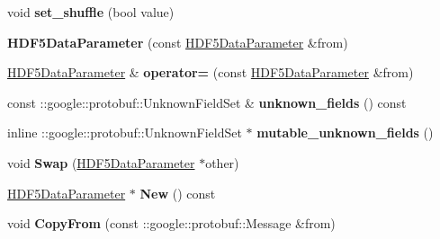 \begin{DoxyCompactItemize}
void {\bfseries set\+\_\+shuffle} (bool value)
\item 
\mbox{\label{classcaffe_1_1_h_d_f5_data_parameter_a2293623f7ee5a6e3eddf5ba1d85a7167}} 
{\bfseries H\+D\+F5\+Data\+Parameter} (const \mbox{\hyperlink{classcaffe_1_1_h_d_f5_data_parameter}{H\+D\+F5\+Data\+Parameter}} \&from)
\item 
\mbox{\label{classcaffe_1_1_h_d_f5_data_parameter_a32b44c77049319d3c9462dbbe1c035d2}} 
\mbox{\hyperlink{classcaffe_1_1_h_d_f5_data_parameter}{H\+D\+F5\+Data\+Parameter}} \& {\bfseries operator=} (const \mbox{\hyperlink{classcaffe_1_1_h_d_f5_data_parameter}{H\+D\+F5\+Data\+Parameter}} \&from)
\item 
\mbox{\label{classcaffe_1_1_h_d_f5_data_parameter_ae8142df8b1c131dd72feabb2b6f55aa2}} 
const \+::google\+::protobuf\+::\+Unknown\+Field\+Set \& {\bfseries unknown\+\_\+fields} () const
\item 
\mbox{\label{classcaffe_1_1_h_d_f5_data_parameter_a88affce8b0da9c58b0a7cda1668a3f1e}} 
inline \+::google\+::protobuf\+::\+Unknown\+Field\+Set $\ast$ {\bfseries mutable\+\_\+unknown\+\_\+fields} ()
\item 
\mbox{\label{classcaffe_1_1_h_d_f5_data_parameter_aa46352d09feb2defaf46d6fe2a24c617}} 
void {\bfseries Swap} (\mbox{\hyperlink{classcaffe_1_1_h_d_f5_data_parameter}{H\+D\+F5\+Data\+Parameter}} $\ast$other)
\item 
\mbox{\label{classcaffe_1_1_h_d_f5_data_parameter_aad83b17bc218bc3b59e68298e0450c49}} 
\mbox{\hyperlink{classcaffe_1_1_h_d_f5_data_parameter}{H\+D\+F5\+Data\+Parameter}} $\ast$ {\bfseries New} () const
\item 
\mbox{\label{classcaffe_1_1_h_d_f5_data_parameter_a548dfb2912846431ed935ea8a5aa1fbd}} 
void {\bfseries Copy\+From} (const \+::google\+::protobuf\+::\+Message \&from)
\item 
\mbox{\label{classcaffe_1_1_h_d_f5_data_parameter_aaaa75f36b1ac55a429b8b09c4ef3239f}} 

\end{DoxyCompactItemize}
